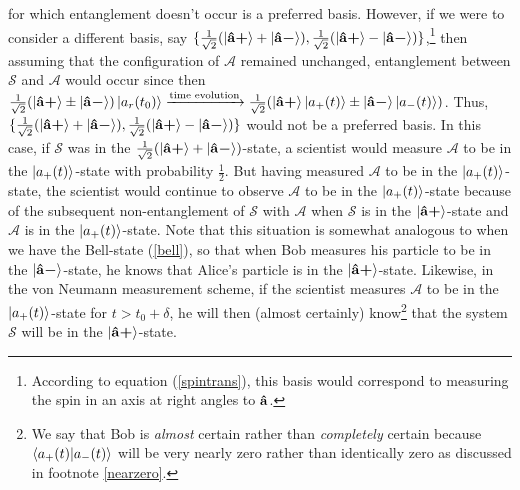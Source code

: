     for which entanglement doesn't occur is a preferred basis. However, if we were to consider a different basis, say $\{\frac{1}{\sqrt{2}}(\ket{\vb{\hat{{a}}}\bm{+}}+\ket{\vb{\hat{{a}}}\bm{-}}), \frac{1}{\sqrt{2}}(\ket{\vb{\hat{{a}}}\bm{+}}-\ket{\vb{\hat{{a}}}\bm{-}})\}$,\footnote{According to equation (\ref{spintrans}), this basis would correspond to measuring the spin in an axis at right angles to 
    $\vb{\hat{{a}}}$.} then assuming that the configuration of $\mathcal{A}$ remained unchanged, entanglement between $\mathcal{S}$ and $\mathcal{A}$ would occur since then 
    $\frac{1}{\sqrt{2}}(\ket{\vb{\hat{{a}}}\bm{+}}\pm\ket{\vb{\hat{{a}}}\bm{-}})\ket{a_r(t_0)}\xrightarrow{\text{time evolution}}\frac{1}{\sqrt{2}}(\ket{\vb{\hat{{a}}}\bm{+}}\ket{a_+(t)}\pm\ket{\vb{\hat{{a}}}\bm{-}}\ket{a_-(t)})$. Thus, $\{\frac{1}{\sqrt{2}}(\ket{\vb{\hat{{a}}}\bm{+}}+\ket{\vb{\hat{{a}}}\bm{-}}), \frac{1}{\sqrt{2}}(\ket{\vb{\hat{{a}}}\bm{+}}-\ket{\vb{\hat{{a}}}\bm{-}})\}$ would not be a preferred basis. In this case, if  $\mathcal{S}$ was in the $\frac{1}{\sqrt{2}}(\ket{\vb{\hat{{a}}}\bm{+}}+\ket{\vb{\hat{{a}}}\bm{-}})$-state, a scientist would measure $\mathcal{A}$ to be in the $\ket{a_+(t)}$-state with probability $\frac{1}{2}$. But having measured $\mathcal{A}$ to be in the $\ket{a_+(t)}$-state, the scientist would continue to observe $\mathcal{A}$ to be in the $\ket{a_+(t)}$-state because of the subsequent non-entanglement of $\mathcal{S}$ with $\mathcal{A}$ when $\mathcal{S}$ is in the   $\ket{\vb{\hat{{a}}}\bm{+}}$-state and $\mathcal{A}$ is in the $\ket{a_+(t)}$-state. Note that this situation is somewhat analogous to when we have the Bell-state (\ref{bell}), so that when Bob measures his particle to be in the $\ket{\vb{\hat{{a}}}\bm{-}}$-state, he knows that Alice's particle is in the $\ket{\vb{\hat{{a}}}\bm{+}}$-state. Likewise, in the von Neumann measurement scheme, if the scientist measures $\mathcal{A}$ to be in the $\ket{a_+(t)}$-state for $t>t_0+\delta$, he will then (almost certainly) know\footnote{We say that Bob is \emph{almost} certain rather than \emph{completely} certain because $\ip{a_+(t)}{a_-(t)}$ will be very nearly zero rather than identically zero as discussed in footnote \ref{nearzero}.} that the system $\mathcal{S}$ will be in the $\ket{\vb{\hat{{a}}}\bm{+}}$-state.
    
